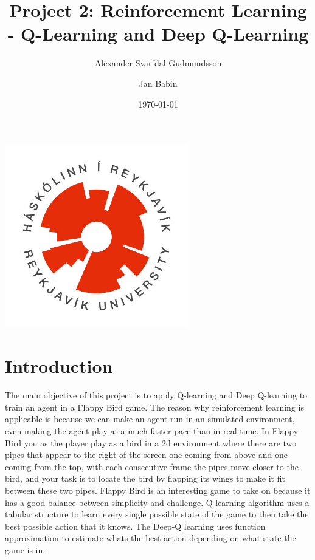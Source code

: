 \documentclass[a4paper,12pt]{article}
\title{Project 2: Reinforcement Learning - Q-Learning and Deep Q-Learning}
\author{Alexander Svarfdal Gudmundsson \and Jan Babin}
\date{\today}
\begin{document}
\maketitle

\begin{center}  
    \includegraphics[width=0.6\textwidth]{HR_logo.jpg}
\end{center}

\clearpage

\tableofcontents

\clearpage

\section{Introduction}
The main objective of this project is to apply Q-learning and Deep Q-learning to train an agent in a Flappy Bird game. 
The reason why reinforcement learning is applicable is because we can make an agent run in an simulated environment, 
even making the agent play at a much faster pace than in real time. 
In Flappy Bird you as the player play as a bird in a 2d environment where there are two pipes that appear to the right of the screen one coming from above and one coming from the top, 
with each consecutive frame the pipes move closer to the bird, and your task is to locate the bird by flapping its wings to make it fit between these two pipes. 
Flappy Bird is an interesting game to take on because it has a good balance between simplicity and challenge. 
Q-learning algorithm uses a tabular structure to learn every single possible state of the game to then take the best possible action that it knows. 
The Deep-Q learning uses function approximation to estimate whats the best action depending on what state the game is in. 
\end{document}
